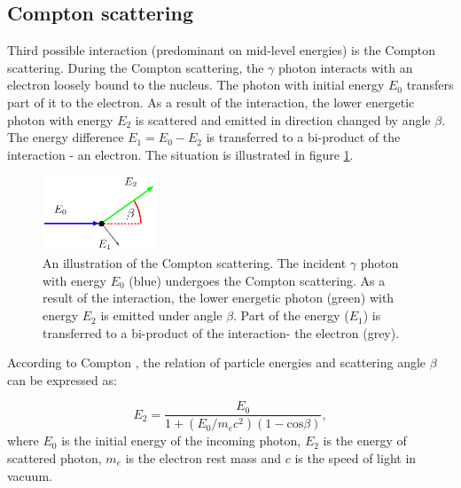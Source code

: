 \subsection{Compton scattering}
Third possible interaction (predominant on mid-level energies) is the Compton scattering.
During the Compton scattering, the $\gamma$ photon interacts with an electron loosely bound to the nucleus.
The photon with initial energy $E_{0}$ transfers part of it to the electron.
As a result of the interaction, the lower energetic photon with energy $E_{2}$ is scattered and emitted in direction changed by angle $\beta$. 
The energy difference $E_{1} = E_{0} - E_{2}$ is transferred to a bi-product of the interaction - an electron.
The situation is illustrated in figure \ref{fig:scattering}.

\begin{figure}[!h]
    \centering
    \includegraphics[width=0.3\textwidth]{./fig/photos/compton_simple.eps}
    \caption{An illustration of the Compton scattering. The incident $\gamma$ photon with energy $E_{0}$ (blue) undergoes the Compton scattering. As a result of the interaction, the lower energetic photon (green) with energy $E_{2}$ is emitted under angle $\beta$. Part of the energy ($E_{1}$) is transferred to a bi-product of the interaction- the electron (grey).}
    \label{fig:scattering}
\end{figure}

According to Compton \cite{compton}, the relation of particle energies and scattering angle $\beta$ can be expressed as:

\begin{equation}
E_{2} = \frac{E_{0}}{  1 + (E_{0} / m_{e}c^{2}) (1 - \mathrm{cos} \beta)},
\end{equation}
where $E_{0}$ is the initial energy of the incoming photon, $E_{2}$ is the energy of scattered photon,  $m_{e}$ is the electron rest mass and $c$ is the speed of light in vacuum. 
\mycomment{ %
  The probability that a photon with an energy $E_{0}$ undergoes a Compton scattering through an angle $\beta$ is described by the Klein-Nishina formula
  \begin{equation}
    K(\beta, E_{0}) = \frac{r_{e}^{2}}{2} \left( \frac{E_{2}}{E_{0}}  \right)^{2} \left(  \frac{E_{2}}{E_{0}} + \frac{E_{0}}{E_{2}} - \mathrm{sin}^{2}(\beta)  \right),
    \label{eq:klein_nishina}
  \end{equation}
  where $r_{e}$ is the classical electron radius. 
}%




